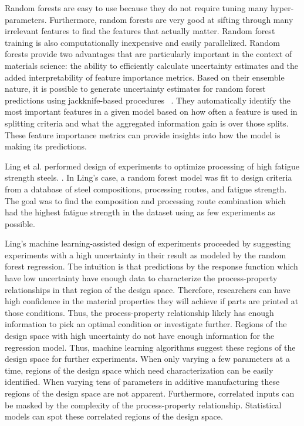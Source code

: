 Random forests are easy to use because they do not require tuning many hyper-parameters. Furthermore, random forests are very good at sifting through many irrelevant features to find the features that actually matter. Random forest training is also computationally inexpensive and easily parallelized. Random forests provide two advantages that are particularly important in the context of materials science: the ability to efficiently calculate uncertainty estimates and the added interpretability of feature importance metrics. Based on their ensemble nature, it is possible to generate uncertainty estimates for random forest predictions using jackknife-based procedures ~\cite{Efron1992, Efron2014, Wager2014}. They automatically identify the most important features in a given model based on how often a feature is used in splitting criteria and what the aggregated information gain is over those splits. These feature importance metrics can provide insights into how the model is making its predictions. 

Ling et al. performed design of experiments to optimize processing of high fatigue strength steels. \cite{Ling2017a}. In Ling's case, a random forest model was fit to design criteria from a database of steel compositions, processing routes, and fatigue strength. The goal was to find the composition and processing route combination which had the highest fatigue strength in the dataset using as few experiments as possible.

Ling's machine learning-assisted design of experiments proceeded by suggesting experiments with a high uncertainty in their result as modeled by the random forest regression. The intuition is that predictions by the response function which have low uncertainty have enough data to characterize the process-property relationships in that region of the design space. Therefore, researchers can have high confidence in the material properties they will achieve if parts are printed at those conditions. Thus, the process-property relationship likely has enough information to pick an optimal condition or investigate further. Regions of the design space with high uncertainty do not have enough information for the regression model. Thus, machine learning algorithms suggest these regions of the design space for further experiments. When only varying a few parameters at a time, regions of the design space which need characterization can be easily identified. When varying tens of parameters in additive manufacturing these regions of the design space are not apparent. Furthermore, correlated inputs can be masked by the complexity of the process-property relationship. Statistical models can spot these correlated regions of the design space.

